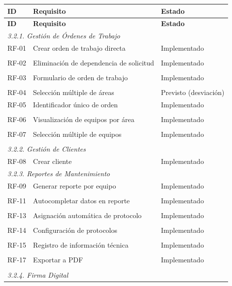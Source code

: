 \documentclass[12pt,a4paper]{article}
\begin{document}
\begingroup
\small
\begin{longtable}{|p{1.6cm}|p{7.6cm}|p{4.3cm}|}
\hline
\textbf{ID} & \textbf{Requisito} & \textbf{Estado} \\
\hline
\endfirsthead
\hline
\textbf{ID} & \textbf{Requisito} & \textbf{Estado} \\
\hline
\endhead
\multicolumn{3}{|l|}{\textit{3.2.1. Gestión de Órdenes de Trabajo}} \\
\hline
RF-01 & Crear orden de trabajo directa & Implementado \\\\
RF-02 & Eliminación de dependencia de solicitud & Implementado \\\\
RF-03 & Formulario de orden de trabajo & Implementado \\\\
RF-04 & Selección múltiple de áreas & Previsto (desviación) \\
RF-05 & Identificador único de orden & Implementado \\\\
RF-06 & Visualización de equipos por área & Implementado \\\\
RF-07 & Selección múltiple de equipos & Implementado \\\\
\hline
\multicolumn{3}{|l|}{\textit{3.2.2. Gestión de Clientes}} \\
\hline
RF-08 & Crear cliente & Implementado \\
\hline
\multicolumn{3}{|l|}{\textit{3.2.3. Reportes de Mantenimiento}} \\
\hline
RF-09 & Generar reporte por equipo & Implementado \\\\
RF-11 & Autocompletar datos en reporte & Implementado \\\\
RF-13 & Asignación automática de protocolo & Implementado \\\\
RF-14 & Configuración de protocolos & Implementado \\\\
RF-15 & Registro de información técnica & Implementado \\\\
RF-17 & Exportar a PDF & Implementado \\\\
\hline
\multicolumn{3}{|l|}{\textit{3.2.4. Firma Digital}} \\

\end{longtable}
\end{document}
